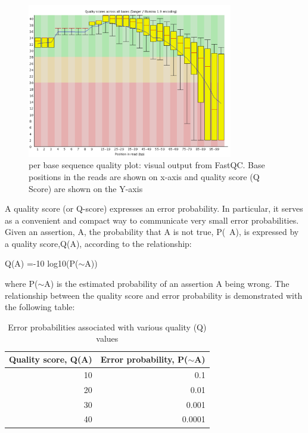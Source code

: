 \begin{figure}[H]
\centering
\includegraphics[width=0.8\textwidth]{ngs-qc/bad_example.png}
\caption{per base sequence quality plot: visual output from FastQC. Base positions in the reads are shown on x-axis and quality score (Q Score) are shown on the Y-axis}
\label{fig:bad_example_plot}
\end{figure}

\begin{information}
A quality score (or Q-score) expresses an error probability.  In particular, it
serves as a convenient and compact way to communicate very small error
probabilities.
Given an assertion, A, the probability that A is not true, P(~A), is expressed
by a quality score,Q(A), according to the relationship:

Q(A) =-10 log10(P($\sim$A))

where P($\sim$A) is the estimated probability of an assertion A being wrong.
The relationship between the quality score and error probability is demonstrated
with the following table:

\begin{table}[H]
  \centering
  \caption{Error probabilities associated with various quality (Q) values}
    \begin{tabular}{rr}
    \toprule
    \textbf{Quality score, Q(A)} & \textbf{Error probability, P($\sim$A)} \\
    \midrule
    10    & 0.1 \\
    20    & 0.01 \\
    30    & 0.001 \\
    40    & 0.0001 \\
    \bottomrule
    \end{tabular}%
  \label{tab:addlabel}%
\end{table}%

\end{information}

